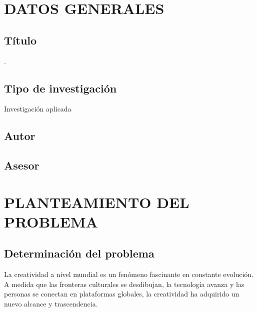 \documentclass[12pt,a4paper]{article}
\begin{document}
\flushbottom






\section{DATOS GENERALES}
\subsection{Título} \titulo.
\subsection{Tipo de investigación} Investigación aplicada
\subsection{Autor} \autor
\subsection{Asesor} \asesor

\section{PLANTEAMIENTO DEL PROBLEMA}
\subsection{Determinación del problema}




La creatividad a nivel mundial es un fenómeno fascinante en constante evolución. A medida que las fronteras culturales se desdibujan, la tecnología avanza y las personas se conectan en plataformas globales, la creatividad ha adquirido un nuevo alcance y trascendencia.
\end{document}
